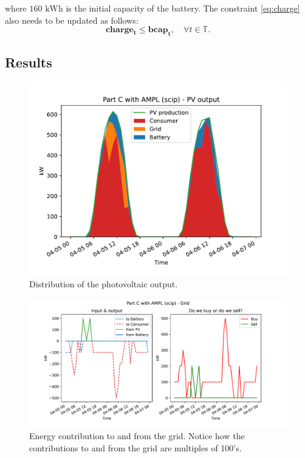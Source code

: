 \documentclass[12pt]{article}
\newcommand{\VAR}[1]{\mathbf{#1}}
\newcommand{\T}{\mathbb{T}}
\begin{document}
where \(160 \text{ kWh}\) is the initial capacity of the battery. The constraint \eqref{eq:charge} also needs to be updated as follows:
\begin{equation}
    \VAR{charge_t} \leq \VAR{bcap_t}, \quad \forall t \in \T.
    \label{eq:charge}
\end{equation}

\subsection{Results}
\begin{figure}[p]
    \centering
    \includegraphics[width=\textwidth]{figs/PartC/pv_output}
    \caption{Distribution of the photovoltaic output.}
\end{figure}

\begin{figure}[p]
    \centering
    \includegraphics[width=\textwidth]{figs/PartC/grid}
    \caption{Energy contribution to and from the grid. Notice how the contributions to and from the grid are multiples of 100's.}
\end{figure}
\end{document}
